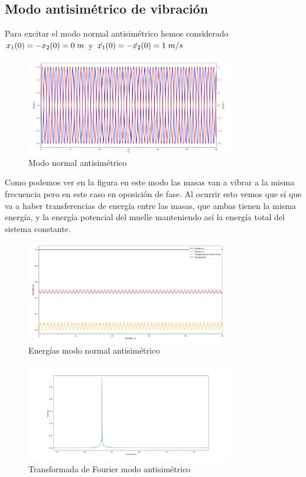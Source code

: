 \documentclass{article}
\begin{document}
\subsection{Modo antisimétrico de vibración}
Para excitar el modo normal antisimétrico hemos considerado $x_1(0)=-x_2(0)=0\hspace{0.1cm}m$ y $\dot{x_1}(0)=-\dot{x_2}(0)=1\hspace{0.1cm}m/s$ 
\begin{figure}[H]
\centering
\includegraphics[width=0.8\textwidth]{antisimetrico}
\caption{ Modo normal antisimétrico}
\label{fig:3}
\end{figure}
Como podemos ver en la figura en este modo las masas van a vibrar a la misma frecuencia pero en este caso en oposición de fase. Al ocurrir esto vemos que sí que va a haber transferencias de energía entre las masas, que ambas tienen la misma energía, y la energía potencial del muelle manteniendo así la energía total del sistema constante.
\begin{figure}[H]
\centering
\includegraphics[width=0.8\textwidth]{antisimetrico_energias}
\caption{Energías modo normal antisimétrico}
\label{fig:3}
\end{figure}
\begin{figure}[H]
\centering
\includegraphics[width=0.8\textwidth]{antisimetrico_fourier}
\caption{Transformada de Fourier modo antisimétrico}
\label{fig:3}
\end{figure}
\end{document}

